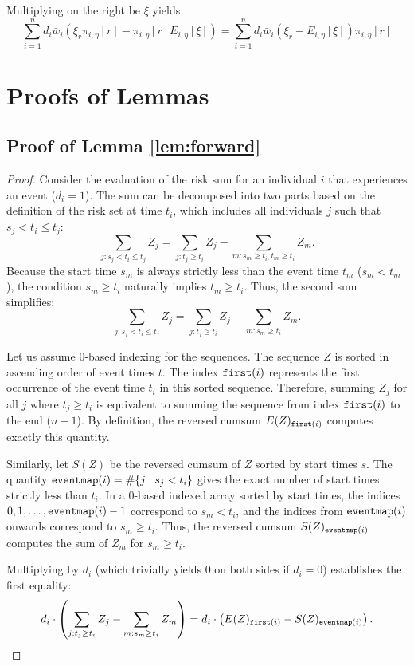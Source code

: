 \documentclass{article}
\begin{document}
Multiplying on the right be $\xi$ yields
$$
\sum_{i=1}^n d_i \bar{w}_i \left( \xi_r \pi_{i,\eta}[r] -
\pi_{i,\eta}[r] E_{i,\eta}[\xi] \right) = 
\sum_{i=1}^n d_i \bar{w}_i  (\xi_r - E_{i,\eta}[\xi]) \pi_{i,\eta}[r] 
$$

\appendix
\section{Proofs of Lemmas}

\subsection*{Proof of Lemma \ref{lem:forward}}
\begin{proof}
Consider the evaluation of the risk sum for an individual $i$ that experiences an event ($d_i = 1$). The sum can be decomposed into two parts based on the definition of the risk set at time $t_i$, which includes all individuals $j$ such that $s_j < t_i \leq t_j$:
$$
\sum_{j: s_j < t_i \leq t_j} Z_j = \sum_{j: t_j \geq t_i} Z_j - \sum_{m: s_m \geq t_i, t_m \geq t_i} Z_m.
$$
Because the start time $s_m$ is always strictly less than the event time $t_m$ ($s_m < t_m$), the condition $s_m \geq t_i$ naturally implies $t_m \geq t_i$. Thus, the second sum simplifies:
$$
\sum_{j: s_j < t_i \leq t_j} Z_j = \sum_{j: t_j \geq t_i} Z_j - \sum_{m: s_m \geq t_i} Z_m.
$$

Let us assume 0-based indexing for the sequences. The sequence $Z$ is sorted in ascending order of event times $t$. The index ${\tt first}(i)$ represents the first occurrence of the event time $t_i$ in this sorted sequence. Therefore, summing $Z_j$ for all $j$ where $t_j \geq t_i$ is equivalent to summing the sequence from index ${\tt first}(i)$ to the end ($n-1$). By definition, the reversed cumsum $E(Z)_{{\tt first}(i)}$ computes exactly this quantity.

Similarly, let $S(Z)$ be the reversed cumsum of $Z$ sorted by start times $s$. The quantity ${\tt eventmap}(i) = \#\{j : s_j < t_i\}$ gives the exact number of start times strictly less than $t_i$. In a 0-based indexed array sorted by start times, the indices $0, 1, \dots, {\tt eventmap}(i)-1$ correspond to $s_m < t_i$, and the indices from ${\tt eventmap}(i)$ onwards correspond to $s_m \geq t_i$. Thus, the reversed cumsum $S(Z)_{{\tt eventmap}(i)}$ computes the sum of $Z_m$ for $s_m \geq t_i$. 

Multiplying by $d_i$ (which trivially yields $0$ on both sides if $d_i=0$) establishes the first equality:
$$
d_i \cdot \left( \sum_{j: t_j \geq t_i} Z_j - \sum_{m: s_m \geq t_i} Z_m \right) = d_i  \cdot \left( E(Z)_{{\tt first}(i)} - S(Z)_{{\tt eventmap}(i)} \right).
$$


\end{proof}
\end{document}
